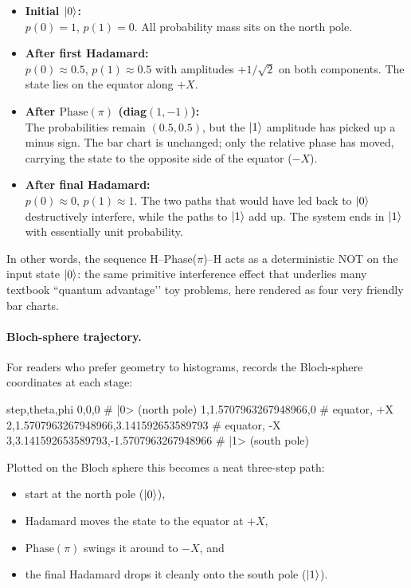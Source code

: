 \documentclass[a4paper,11pt]{article}
\begin{document}
\begin{itemize}
  \item \textbf{Initial $\lvert 0 \rangle$:}\\
    $p(0) = 1$, $p(1) = 0$. All probability mass sits on the north pole.
  \item \textbf{After first Hadamard:}\\
    $p(0) \approx 0.5$, $p(1) \approx 0.5$ with amplitudes $+1/\sqrt{2}$ on both components. The state lies on the equator along $+X$.
  \item \textbf{After $\mathrm{Phase}(\pi)$ (diag$(1,-1)$):}\\
    The probabilities remain $(0.5, 0.5)$, but the $\lvert 1 \rangle$ amplitude has picked up a minus sign. The bar chart is unchanged; only the relative phase has moved, carrying the state to the opposite side of the equator ($-X$).
  \item \textbf{After final Hadamard:}\\
    $p(0) \approx 0$, $p(1) \approx 1$. The two paths that would have led back to $\lvert 0 \rangle$ destructively interfere, while the paths to $\lvert 1 \rangle$ add up. The system ends in $\lvert 1 \rangle$ with essentially unit probability.
\end{itemize}

In other words, the sequence H--Phase($\pi$)--H acts as a deterministic NOT on the input state $\lvert 0 \rangle$: the same primitive interference effect that underlies many textbook “quantum advantage’’ toy problems, here rendered as four very friendly bar charts.

\paragraph{Bloch-sphere trajectory.}

For readers who prefer geometry to histograms,  records the Bloch-sphere coordinates at each stage:

\begin{datadumpnofloat}
step,theta,phi
0,0,0                         # |0> (north pole)
1,1.5707963267948966,0        # equator, +X
2,1.5707963267948966,3.141592653589793   # equator, -X
3,3.141592653589793,-1.5707963267948966  # |1> (south pole)
\end{datadumpnofloat}

Plotted on the Bloch sphere this becomes a neat three-step path:

\begin{itemize}
  \item start at the north pole ($\lvert 0 \rangle$),
  \item Hadamard moves the state to the equator at $+X$,
  \item $\mathrm{Phase}(\pi)$ swings it around to $-X$, and
  \item the final Hadamard drops it cleanly onto the south pole ($\lvert 1 \rangle$).
\end{itemize}
\end{document}
